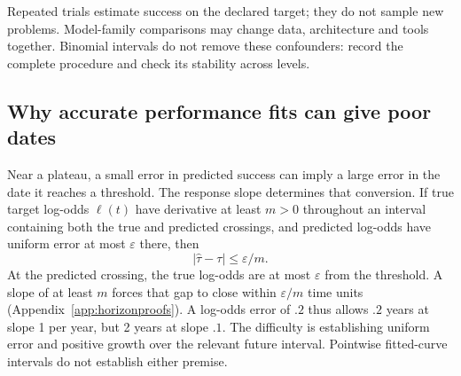 Repeated trials estimate success on the declared target; they do not sample new problems. Model-family comparisons may change data, architecture and tools together. Binomial intervals do not remove these confounders: record the complete procedure and check its stability across levels.

\subsection{Why accurate performance fits can give poor dates}
Near a plateau, a small error in predicted success can imply a large error in the date it reaches a threshold. The response slope determines that conversion. If true target log-odds $\ell(t)$ have derivative at least $m>0$ throughout an interval containing both the true and predicted crossings, and predicted log-odds have uniform error at most $\varepsilon$ there, then
\begin{equation}
 |\widehat\tau-\tau|\le\varepsilon/m.
 \label{eq:timeerror}
\end{equation}
At the predicted crossing, the true log-odds are at most $\varepsilon$ from the threshold. A slope of at least $m$ forces that gap to close within $\varepsilon/m$ time units (Appendix~\ref{app:horizonproofs}). A log-odds error of $.2$ thus allows $.2$ years at slope 1 per year, but 2 years at slope $.1$. The difficulty is establishing uniform error and positive growth over the relevant future interval. Pointwise fitted-curve intervals do not establish either premise.

